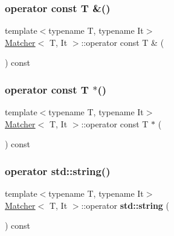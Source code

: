 \mbox{\label{class_matcher_a7b808eac9d5d10c2d417869bf630d6ec}} 
\subsubsection{\texorpdfstring{operator const T \&()}{operator const T \&()}}
{\footnotesize\ttfamily template$<$typename T, typename It$>$ \\
\hyperlink{class_matcher}{Matcher}$<$ T, It $>$\+::operator const T \& (\begin{DoxyParamCaption}{ }\end{DoxyParamCaption}) const\hspace{0.3cm}{\ttfamily [inline]}}

\mbox{\label{class_matcher_ae3f74b07e355126855e40db722c7a51d}} 
\subsubsection{\texorpdfstring{operator const T $\ast$()}{operator const T *()}}
{\footnotesize\ttfamily template$<$typename T, typename It$>$ \\
\hyperlink{class_matcher}{Matcher}$<$ T, It $>$\+::operator const T $\ast$ (\begin{DoxyParamCaption}{ }\end{DoxyParamCaption}) const\hspace{0.3cm}{\ttfamily [inline]}}

\mbox{\label{class_matcher_adc54a96fcfc40186d82a91baeb09211c}} 
\subsubsection{\texorpdfstring{operator std\+::string()}{operator std::string()}}
{\footnotesize\ttfamily template$<$typename T, typename It$>$ \\
\hyperlink{class_matcher}{Matcher}$<$ T, It $>$\+::operator \textbf{ std\+::string} (\begin{DoxyParamCaption}{ }\end{DoxyParamCaption}) const\hspace{0.3cm}{\ttfamily [inline]}}

